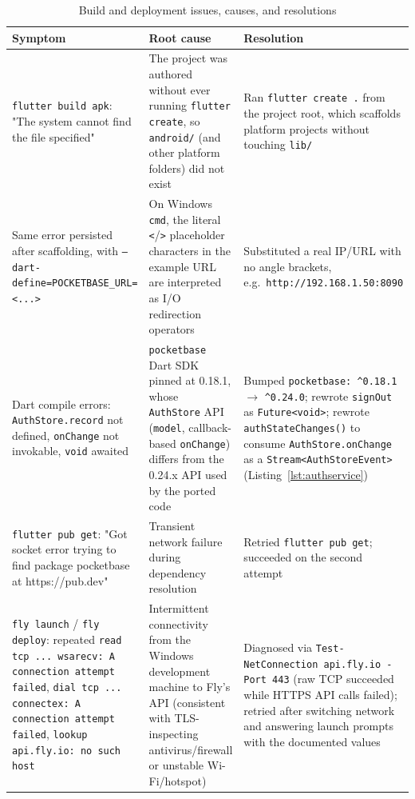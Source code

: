 \documentclass[11pt,a4paper]{article}
\begin{document}
\begin{table}[htbp]
\centering
\caption{Build and deployment issues, causes, and resolutions}
\label{tab:issues}
\begin{tabular}{@{}p{3.4cm}p{4.3cm}p{4.6cm}@{}}
\toprule
\textbf{Symptom} & \textbf{Root cause} & \textbf{Resolution} \\
\midrule
\texttt{flutter build apk}: "The system cannot find the file specified" &
The project was authored without ever running \texttt{flutter create}, so
\texttt{android/} (and other platform folders) did not exist &
Ran \texttt{flutter create .} from the project root, which scaffolds platform
projects without touching \texttt{lib/} \\
\addlinespace
Same error persisted after scaffolding, with
\texttt{--dart-define=POCKETBASE\_URL=<...>} &
On Windows \texttt{cmd}, the literal \texttt{<}/\texttt{>} placeholder characters
in the example URL are interpreted as I/O redirection operators &
Substituted a real IP/URL with no angle brackets, e.g.\
\texttt{http://192.168.1.50:8090} \\
\addlinespace
Dart compile errors: \texttt{AuthStore.record} not defined,
\texttt{onChange} not invokable, \texttt{void} awaited &
\texttt{pocketbase} Dart SDK pinned at 0.18.1, whose \texttt{AuthStore} API
(\texttt{model}, callback-based \texttt{onChange}) differs from the
0.24.x API used by the ported code &
Bumped \texttt{pocketbase: \textasciicircum 0.18.1} $\rightarrow$ \texttt{\textasciicircum 0.24.0}; rewrote
\texttt{signOut} as \texttt{Future<void>}; rewrote
\texttt{authStateChanges()} to consume \texttt{AuthStore.onChange} as a
\texttt{Stream<AuthStoreEvent>} (Listing~\ref{lst:authservice}) \\
\addlinespace
\texttt{flutter pub get}: "Got socket error trying to find package pocketbase
at https://pub.dev" &
Transient network failure during dependency resolution &
Retried \texttt{flutter pub get}; succeeded on the second attempt \\
\addlinespace
\texttt{fly launch} / \texttt{fly deploy}: repeated
\texttt{read tcp ... wsarecv: A connection attempt failed},
\texttt{dial tcp ... connectex: A connection attempt failed},
\texttt{lookup api.fly.io: no such host} &
Intermittent connectivity from the Windows development machine to Fly's
API (consistent with TLS-inspecting antivirus/firewall or unstable
Wi-Fi/hotspot) &
Diagnosed via \texttt{Test-NetConnection api.fly.io -Port 443} (raw TCP
succeeded while HTTPS API calls failed); retried after switching network
and answering launch prompts with the documented values

\end{tabular}
\end{table}
\end{document}
